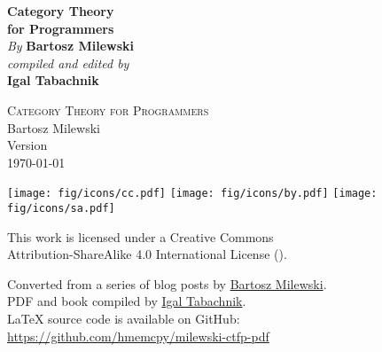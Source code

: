 

\thispagestyle{empty}

\vspace*{80pt}

\begin{raggedleft}
\fontsize{24pt}{24pt}\selectfont
\textbf{Category Theory \\ for Programmers}\\
\ifdefined{}
\fi
\vspace*{1cm}
\fontsize{16pt}{18pt}\selectfont \textit{By } \textbf{Bartosz Milewski}\\
\vspace{1cm}
\fontsize{12pt}{14pt}\selectfont \textit{compiled and edited by}\\ \textbf{Igal Tabachnik}\\

\end{raggedleft}


\newpage

\vspace*{0.3\textheight}
\thispagestyle{empty}

\begin{small}
\begin{center}

\textsc{Category Theory for Programmers}\\

\vspace{1.0em}
\noindent
Bartosz Milewski\\

\vspace{1.26em}
\noindent
Version \texttt{\OPTversion}\\\today


\vspace{1.6em}
\noindent
\texttt{[image: fig/icons/cc.pdf]}
\texttt{[image: fig/icons/by.pdf]}
\texttt{[image: fig/icons/sa.pdf]}

\vspace{0.4em}
\noindent
This work is licensed under a Creative Commons\\
Attribution-ShareAlike 4.0 International License
(\href{http://creativecommons.org/licenses/by-sa/4.0/}{}).

\vspace{1.26em}
\noindent
Converted from a series of blog posts by \href{https://bartoszmilewski.com/2014/10/28/category-theory-for-programmers-the-preface/}{Bartosz Milewski}.\\
PDF and book compiled by \href{https://hmemcpy.com}{Igal Tabachnik}.\\
\vspace{1.26em}
\noindent
\LaTeX{} source code is available on GitHub: \href{https://github.com/hmemcpy/milewski-ctfp-pdf}{https://github.com/hmemcpy/milewski-ctfp-pdf}
\end{center}
\end{small}